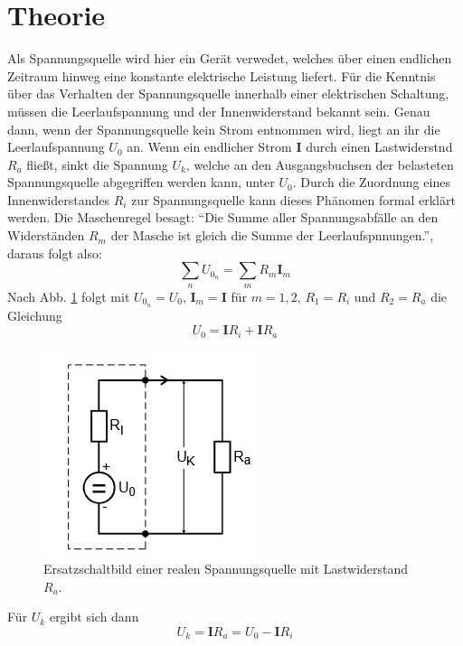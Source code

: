 \section{Theorie}
\label{sec:Theorie}
Als Spannungsquelle wird hier ein Gerät verwedet, welches über einen endlichen Zeitraum hinweg eine konstante elektrische Leistung liefert.
Für die Kenntnis über das Verhalten der Spannungsquelle innerhalb einer elektrischen Schaltung, müssen die Leerlaufspannung und der Innenwiderstand bekannt sein.
Genau dann, wenn der Spannungsquelle kein Strom entnommen wird, liegt an ihr die Leerlaufspannung $U_0$ an.
Wenn ein endlicher Strom $\symbf{I}$ durch einen Lastwiderstnd $R_a$ fließt, sinkt die Spannung $U_k$, welche an den Ausgangsbuchsen der belasteten Spannungsquelle abgegriffen werden kann, unter $U_0$.
Durch die Zuordnung eines Innenwiderstandes $R_i$ zur Spannungsquelle kann dieses Phänomen formal erklärt werden.
Die Maschenregel besagt: \enquote{Die Summe aller Spannungsabfälle an den Widerständen $R_m$ der Masche ist gleich die Summe der Leerlaufspnnungen.}, daraus folgt also:
\begin{equation}
  \sum_{n} U_{0_n} = \sum_{m} R_m \symbf{I}_m
  \label{eqn:eq1}
\end{equation}
Nach Abb. \ref{fig:abb1} folgt mit $U_{0_n} = U_0$, $\symbf{I}_m = \symbf{I}$ für $m = 1, 2$, $R_1 = R_i$ und $R_2 = R_a$ die Gleichung
\begin{equation}
  U_0 = \symbf{I} R_i + \symbf{I} R_a
  \label{eqn:eq2}
\end{equation}
\begin{figure}
  \centering
  \includegraphics{data/abb1.jpg}
  \caption{Ersatzschaltbild einer realen Spannungsquelle mit Lastwiderstand $R_a$. \cite{V301}}
  \label{fig:abb1}
\end{figure}
\FloatBarrier
\noindent
Für $U_k$ ergibt sich dann
\begin{equation}
  U_k = \symbf{I} R_a = U_0 - \symbf{I} R_i
  \label{eqn:eq3}
\end{equation}
